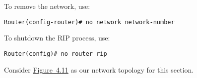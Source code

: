 \documentclass{../UTNetLab}
\begin{document}
To remove the network, use:
\begin{lstlisting}[language={cisco}, emph={network-number}]
Router(config-router)# no network network-number
    \end{lstlisting}
To shutdown the RIP process, use:
\begin{lstlisting}[language={cisco}]
Router(config)# no router rip
    \end{lstlisting}
Consider \hyperref[fig:4.11]{Figure~4.11} as our network topology for this section.

\end{document}
